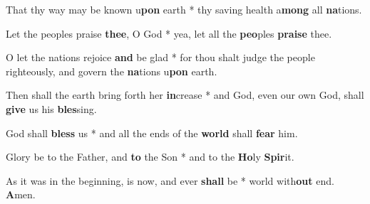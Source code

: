 \begin{multicols}{2}
	That thy way may be known u\textbf{pon} earth * thy saving health a\textbf{mong} all \textbf{na}tions.
	
	Let the peoples praise \textbf{thee}, O God * yea, let all the \textbf{peo}ples \textbf{praise} thee.
	
	O let the nations rejoice \textbf{and} be glad * for thou shalt judge the people righteously, and govern the \textbf{na}tions u\textbf{pon} earth.
	
	Then shall the earth bring forth her \textbf{in}crease * and God, even our own God, shall \textbf{give} us his \textbf{bles}sing.
	
	God shall \textbf{bless} us * and all the ends of the \textbf{world} shall \textbf{fear} him.
	
	Glory be to the Father, and \textbf{to} the Son * and to the \textbf{Ho}ly \textbf{Spir}it.
	
	As it was in the beginning, is now, and ever \textbf{shall} be * world with\textbf{out} end. \textbf{A}men.
\end{multicols}
